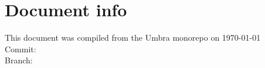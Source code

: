 \documentclass[11pt,a4paper,oneside]{report}
\begin{document}
    \listoffigures{}
    \listoflistings{}


    



    \appendix
    

    \newpage
    \chapter*{Document info}
    This document was compiled from the Umbra monorepo on \today \\
    Commit: \gitcommit \\
    Branch: \gitbranch \\

\end{document}
